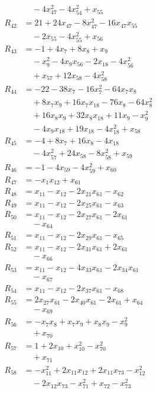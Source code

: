 \begin{align*}
&\quad{}-4x_{47}^{2}-4x_{54}^{2}+x_{55}\\
R_{42}&=21+24x_{47}-8x_{47}^{2}-16x_{47}x_{55}\\
&\quad{}-2x_{55}-4x_{55}^{2}+x_{56}\\
R_{43}&=-1+4x_{7}+8x_{8}+x_{9}\\
&\quad{}-x_{9}^{2}-4x_{9}x_{56}-2x_{18}-4x_{56}^{2}\\
&\quad{}+x_{57}+12x_{58}-4x_{58}^{2}\\
R_{44}&=-22-38x_{7}-16x_{7}^{2}-64x_{7}x_{8}\\
&\quad{}+8x_{7}x_{9}+16x_{7}x_{18}-76x_{8}-64x_{8}^{2}\\
&\quad{}+16x_{8}x_{9}+32x_{8}x_{18}+11x_{9}-x_{9}^{2}\\
&\quad{}-4x_{9}x_{18}+19x_{18}-4x_{18}^{2}+x_{58}\\
R_{45}&=-4+8x_{7}+16x_{8}-4x_{18}\\
&\quad{}-4x_{57}^{2}+24x_{58}-8x_{58}^{2}+x_{59}\\
R_{46}&=-1-4x_{59}-4x_{59}^{2}+x_{60}\\
R_{47}&=-x_{1}x_{12}+x_{61}\\
R_{48}&=x_{11}-x_{12}-2x_{21}x_{61}-x_{62}\\
R_{49}&=x_{11}-x_{12}-2x_{25}x_{61}-x_{63}\\
R_{50}&=x_{11}-x_{12}-2x_{27}x_{61}-2x_{61}\\
&\quad{}-x_{64}\\
R_{51}&=x_{11}-x_{12}-2x_{29}x_{61}-x_{65}\\
R_{52}&=x_{11}-x_{12}-2x_{31}x_{61}+2x_{61}\\
&\quad{}-x_{66}\\
R_{53}&=x_{11}-x_{12}-4x_{33}x_{61}-2x_{34}x_{61}\\
&\quad{}-x_{67}\\
R_{54}&=x_{11}-x_{12}-2x_{37}x_{61}-x_{68}\\
R_{55}&=2x_{27}x_{61}-2x_{40}x_{61}-2x_{61}+x_{64}\\
&\quad{}-x_{69}\\
R_{56}&=-x_{7}x_{8}+x_{7}x_{9}+x_{8}x_{9}-x_{9}^{2}\\
&\quad{}+x_{70}\\
R_{57}&=1+2x_{10}+x_{10}^{2}-x_{70}^{2}\\
&\quad{}+x_{71}\\
R_{58}&=-x_{11}^{2}+2x_{11}x_{12}+2x_{11}x_{73}-x_{12}^{2}\\
&\quad{}-2x_{12}x_{73}-x_{71}^{2}+x_{72}-x_{73}^{2}\\

\end{align*}
